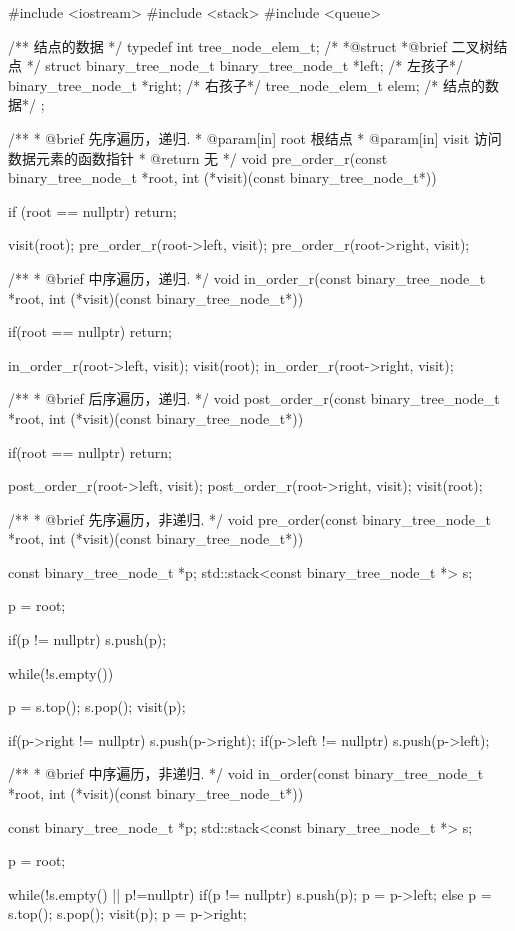 \begin{Codex}[label=binary_tree.cpp]
#include <iostream>
#include <stack>
#include <queue>

/** 结点的数据 */
typedef int tree_node_elem_t;
 /*
  *@struct
  *@brief 二叉树结点
  */
struct binary_tree_node_t {
    binary_tree_node_t *left;   /* 左孩子*/
    binary_tree_node_t *right;   /* 右孩子*/
    tree_node_elem_t elem; /* 结点的数据*/
};

/**
  * @brief 先序遍历，递归.
  * @param[in] root 根结点
  * @param[in] visit 访问数据元素的函数指针
  * @return 无
  */
void pre_order_r(const binary_tree_node_t *root,
                 int (*visit)(const binary_tree_node_t*)) {
    if (root == nullptr) return;

    visit(root);
    pre_order_r(root->left, visit);
    pre_order_r(root->right, visit);
}

/**
  * @brief 中序遍历，递归.
  */
void in_order_r(const binary_tree_node_t *root,
                int (*visit)(const binary_tree_node_t*)) {
    if(root == nullptr) return;

    in_order_r(root->left, visit);
    visit(root);
    in_order_r(root->right, visit);
}

/**
  * @brief 后序遍历，递归.
  */
void post_order_r(const binary_tree_node_t *root,
                  int (*visit)(const binary_tree_node_t*)) {
    if(root == nullptr) return;

    post_order_r(root->left, visit);
    post_order_r(root->right, visit);
    visit(root);
}

/**
 * @brief 先序遍历，非递归.
 */
void pre_order(const binary_tree_node_t *root,
               int (*visit)(const binary_tree_node_t*)) {
    const binary_tree_node_t *p;
    std::stack<const binary_tree_node_t *> s;

    p = root;

    if(p != nullptr) s.push(p);

    while(!s.empty()) {
        p = s.top();
        s.pop();
        visit(p);

        if(p->right != nullptr) s.push(p->right);
        if(p->left != nullptr) s.push(p->left);
    }
}

/**
 * @brief 中序遍历，非递归.
 */
void in_order(const binary_tree_node_t *root,
              int (*visit)(const binary_tree_node_t*)) {
    const binary_tree_node_t *p;
    std::stack<const binary_tree_node_t *> s;

    p = root;

    while(!s.empty() || p!=nullptr) {
        if(p != nullptr) {
            s.push(p);
            p = p->left;
        } else {
            p = s.top();
            s.pop();
            visit(p);
            p = p->right;
        }
    }
}


\end{Codex}

